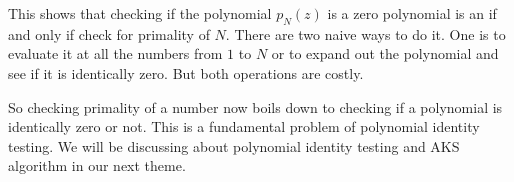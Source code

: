 This shows that checking if the polynomial $p_N(z)$ is a zero polynomial is an
if and only if check for primality of $N$. There are two naive ways to do it.
One is to evaluate it at all the numbers from $1$ to $N$ or to expand out the
polynomial and see if it is identically zero. But both operations are costly.

So checking primality of a number now boils down to checking if a polynomial
is identically zero or not. This is a fundamental problem of polynomial
identity testing. We will be discussing about polynomial identity testing and 
AKS algorithm in our next theme.
